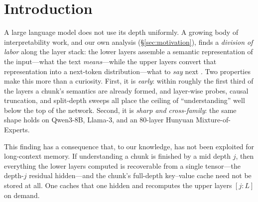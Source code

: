 \section{Introduction}
\label{sec:intro}
A large language model does not use its depth uniformly. A growing body of
interpretability work, and our own analysis (\S\ref{sec:motivation}), finds a
\emph{division of labor} along the layer stack: the lower layers assemble a
semantic representation of the input---what the text \emph{means}---while the
upper layers convert that representation into a next-token distribution---what
to \emph{say} next \citep{stagesofinference}. Two properties make this more than
a curiosity. First, it is \emph{early}: within roughly the first third of the
layers a chunk's semantics are already formed, and layer-wise probes, causal
truncation, and split-depth sweeps all place the ceiling of ``understanding''
well below the top of the network. Second, it is \emph{sharp and cross-family}:
the same shape holds on Qwen3-8B, Llama-3, and an 80-layer Hunyuan
Mixture-of-Experts.

This finding has a consequence that, to our knowledge, has not been exploited
for long-context memory. If understanding a chunk is finished by a mid depth
$j$, then everything the lower layers computed is recoverable from a single
tensor---the depth-$j$ residual hidden---and the chunk's full-depth key--value
cache need not be stored at all. One caches that one hidden and recomputes the
upper layers $[j{:}L]$ on demand.

